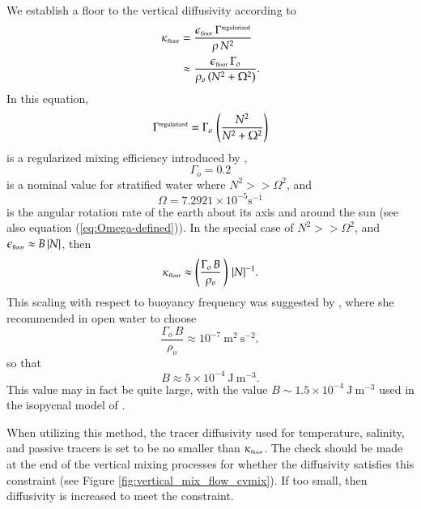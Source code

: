 We establish a floor to the vertical diffusivity according to
\begin{equation}
\begin{split}
  \kappa_{\mbox{\tiny floor}} &= \frac{ \epsilon_{\mbox{\tiny floor}}  \, \Gamma^{\mbox{\tiny regularized}}}{\rho \, N^{2}} 
  \\
 &\approx \frac{\epsilon_{\mbox{\tiny floor}} \, \Gamma_{o}  }{\rho_{o} \, (N^{2} + \Omega^{2})}.
\end{split}
\end{equation}
 In this equation, 
\begin{equation}
 \Gamma^{\mbox{\tiny regularized}} = \Gamma_{o} \,  \left( \frac{ N^{2}}{ N^{2} +\Omega^{2}} \right)
\end{equation}
is a regularized mixing efficiency introduced by
\cite{Melet_etal_2013},
\begin{equation}
 \Gamma_{o} = 0.2
\end{equation}
is a nominal value for stratified water where $N^{2} >> \Omega^{2}$,
and
\begin{equation}
 \Omega = 7.2921 \times 10^{-5} \mbox{s}^{-1}
\end{equation} 
is the angular rotation rate of the earth about its axis and around
the sun (see also equation (\ref{eq:Omega-defined})).  In the special
case of $N^{2} >> \Omega^{2}$, and $\epsilon_{\mbox{\tiny floor}}
\approx B \, |N|$, then
\begin{equation}
 \kappa_{\mbox{\tiny floor}} \approx \left( \frac{ \Gamma_{o} \,  B }{\rho_{o}} \, \right) \, |N|^{-1}.
\label{eq:gargett-scaling}
\end{equation} 
This scaling with respect to buoyancy frequency was suggested by
\cite{Gargett1984}, where she recommended in open water to choose
\begin{equation}
   \frac{ \Gamma_{o} \,  B }{\rho_{o}} \approx 10^{-7}~\mbox{m}^{2}~\mbox{s}^{-2},
\end{equation}
 so that 
\begin{equation}
 B \approx 5 \times  10^{-4}~\mbox{J}~\mbox{m}^{-3}.
\end{equation}
This value may in fact be quite large, with the value $B \sim 1.5
\times 10^{-4}~\mbox{J}~\mbox{m}^{-3}$ used in the isopycnal model of
\cite{Dunne_etal_part1_2012}.

When utilizing this method, the tracer diffusivity used for
temperature, salinity, and passive tracers is set to be no smaller
than $\kappa_{\mbox{\tiny floor}}$.  The check should be made at the
end of the vertical mixing processes for whether the diffusivity
satisfies this constraint (see Figure
\ref{fig:vertical_mix_flow_cvmix}).  If too small, then diffusivity is
increased to meet the constraint.
